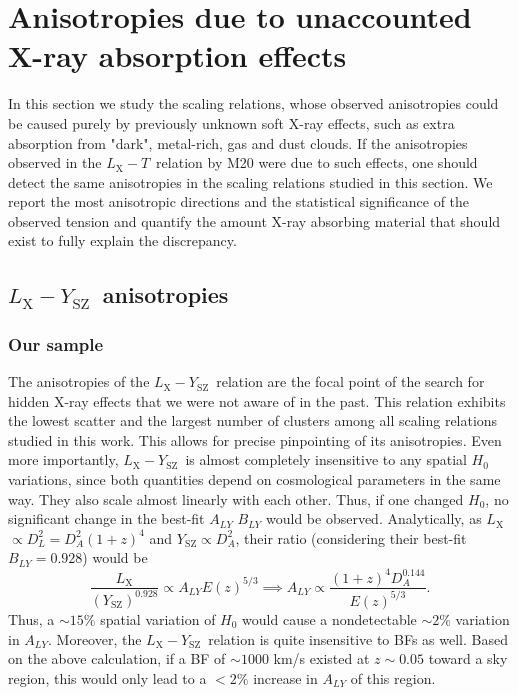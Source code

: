 \documentclass{aa}   %
\newcommand{\LT}{$L_{\text{X}}-T$}
\newcommand{\LY}{$L_{\text{X}}-Y_{\text{SZ}}$}
\newcommand{\Lx}{$L_{\text{X}}$}
\newcommand{\Ysz}{$Y_{\text{SZ}}$}
\begin{document}
\section{Anisotropies due to unaccounted X-ray absorption effects}\label{xray_abs_anis}

In this section we study the scaling relations, whose observed anisotropies could be caused purely by previously unknown soft X-ray effects, such as extra absorption from "dark", metal-rich, gas and dust clouds. If the anisotropies observed in the \LT\ relation by M20 were due to such effects, one should detect the same anisotropies in the scaling relations studied in this section. We report the most anisotropic directions and the statistical significance of the observed tension and quantify the amount X-ray absorbing material that should exist to fully explain the discrepancy.

\subsection{\LY\ anisotropies}

\subsubsection{Our sample}

The anisotropies of the \LY\ relation are the focal point of the search for hidden X-ray effects that we were not aware of in the past. This relation exhibits the lowest scatter and the largest number of clusters among all scaling relations studied in this work. This allows for precise pinpointing of its anisotropies. Even more importantly, \LY\ is almost completely insensitive to any spatial $H_0$ variations, since both quantities depend on cosmological parameters in the same way. They also scale almost linearly with each other. Thus, if one changed $H_0$, no significant change in the best-fit $A_{LY}$ $B_{LY}$ would be observed. Analytically, as \Lx$\propto D_L^2= D_A^2 (1+z)^4$ and \Ysz$\propto D_A^2$, their ratio (considering their best-fit $B_{LY}=0.928$) would be 
\begin{equation}
\dfrac{L_{\text{X}}}{(Y_{\text{SZ}})^{0.928}}\propto A_{LY}E(z)^{5/3}\implies A_{LY}\propto \dfrac{(1+z)^{4} D_A^{0.144}}{E(z)^{5/3}}.
\end{equation}
Thus, a $\sim 15\%$ spatial variation of $H_0$ would cause a nondetectable $\sim 2\%$ variation in $A_{LY}$. Moreover, the \LY\ relation is quite insensitive to BFs as well. Based on the above calculation, if a BF of $\sim 1000$ km/s existed at $z\sim 0.05$ toward a sky region, this would only lead to a $< 2\%$ increase in $A_{LY}$ of this region. 
\end{document}
